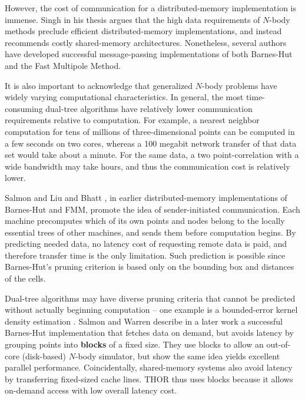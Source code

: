 \documentclass[twoside,leqno,twocolumn]{article}
\newcommand{\defterm}[1]{{\bf #1}}
\begin{document}
However, the cost of communication for a distributed-memory implementation is immense.
Singh in his thesis \cite{singh_thesis} argues that the high data requirements of $N$-body methods preclude efficient distributed-memory implementations, and instead recommends costly shared-memory architectures.
Nonetheless, several authors \cite{salmon_thesis, liu94experiences, salmon97parallel} have developed successful message-passing implementations of both Barnes-Hut and the Fast Multipole Method.

It is also important to acknowledge that generalized $N$-body problems have widely varying computational characteristics.
In general, the most time-consuming dual-tree algorithms have relatively lower communication requirements relative to computation.
For example, a nearest neighbor computation for tens of millions of three-dimensional points can be computed in a few seconds on two cores, whereas a 100 megabit network transfer of that data set would take about a minute.
For the same data, a two point-correlation with a wide bandwidth may take hours, and thus the communication cost is relatively lower.

Salmon \cite{salmon_thesis} and Liu and Bhatt \cite{liu94experiences}, in earlier distributed-memory implementations of Barnes-Hut and FMM, promote the idea of sender-initiated communication.
Each machine precomputes which of its own points and nodes belong to the locally essential trees of other machines, and sends them before computation begins.
By predicting needed data, no latency cost of requesting remote data is paid, and therefore transfer time is the only limitation.
Such prediction is possible since Barnes-Hut's pruning criterion is based only on the bounding box and distances of the cells.

Dual-tree algorithms may have diverse pruning criteria that cannot be predicted without actually beginning computation -- one example is a bounded-error kernel density estimation \cite{gray_kde}.
Salmon and Warren describe in a later work \cite{salmon97parallel} a successful Barnes-Hut implementation that fetches data on demand, but avoids latency by grouping points into \defterm{blocks} of a fixed size.
They use blocks to allow an out-of-core (disk-based) $N$-body simulator, but show the same idea yields excellent parallel performance.
Coincidentally, shared-memory systems also avoid latency by transferring fixed-sized cache lines.
THOR thus uses blocks because it allows on-demand access with low overall latency cost.
\end{document}
